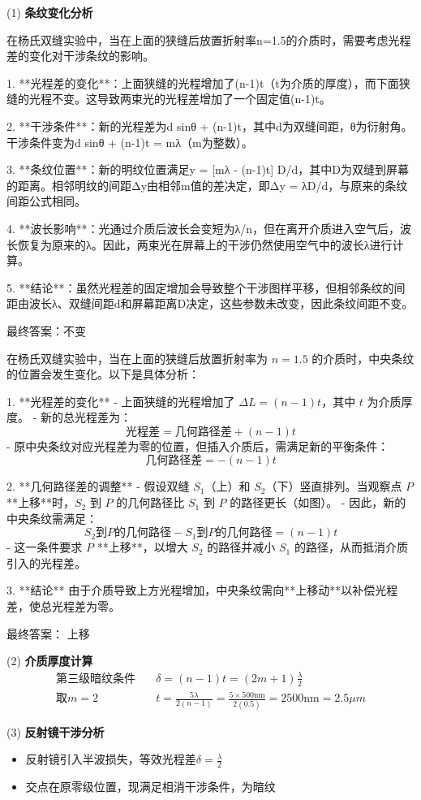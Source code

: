 \documentclass{article}
\begin{document}
\item[(1)] \textbf{条纹变化分析}
\begin{enumerate}
在杨氏双缝实验中，当在上面的狭缝后放置折射率n=1.5的介质时，需要考虑光程差的变化对干涉条纹的影响。

1. **光程差的变化**：上面狭缝的光程增加了(n-1)t（t为介质的厚度），而下面狭缝的光程不变。这导致两束光的光程差增加了一个固定值(n-1)t。

2. **干涉条件**：新的光程差为d sinθ + (n-1)t，其中d为双缝间距，θ为衍射角。干涉条件变为d sinθ + (n-1)t = mλ（m为整数）。

3. **条纹位置**：新的明纹位置满足y = [mλ - (n-1)t] D/d，其中D为双缝到屏幕的距离。相邻明纹的间距Δy由相邻m值的差决定，即Δy = λD/d，与原来的条纹间距公式相同。

4. **波长影响**：光通过介质后波长会变短为λ/n，但在离开介质进入空气后，波长恢复为原来的λ。因此，两束光在屏幕上的干涉仍然使用空气中的波长λ进行计算。

5. **结论**：虽然光程差的固定增加会导致整个干涉图样平移，但相邻条纹的间距由波长λ、双缝间距d和屏幕距离D决定，这些参数未改变，因此条纹间距不变。

最终答案：不变
\end{enumerate}
\begin{enumerate}
    在杨氏双缝实验中，当在上面的狭缝后放置折射率为 \( n = 1.5 \) 的介质时，中央条纹的位置会发生变化。以下是具体分析：

1. **光程差的变化**  
   - 上面狭缝的光程增加了 \( \Delta L = (n-1)t \)，其中 \( t \) 为介质厚度。
   - 新的总光程差为：  
     \[
     \text{光程差} = \text{几何路径差} + (n-1)t
     \]
   - 原中央条纹对应光程差为零的位置，但插入介质后，需满足新的平衡条件：  
     \[
     \text{几何路径差} = -(n-1)t
     \]

2. **几何路径差的调整**  
   - 假设双缝 \( S_1 \)（上）和 \( S_2 \)（下）竖直排列。当观察点 \( P \) **上移**时，\( S_2 \) 到 \( P \) 的几何路径比 \( S_1 \) 到 \( P \) 的路径更长（如图）。  
   - 因此，新的中央条纹需满足：  
     \[
     S_2 \text{到} P \text{的几何路径} - S_1 \text{到} P \text{的几何路径} = (n-1)t
     \]
   - 这一条件要求 \( P \) **上移**，以增大 \( S_2 \) 的路径并减小 \( S_1 \) 的路径，从而抵消介质引入的光程差。

3. **结论**  
   由于介质导致上方光程增加，中央条纹需向**上移动**以补偿光程差，使总光程差为零。

最终答案：  上移
\end{enumerate}
  
  \item[(2)] \textbf{介质厚度计算}
  \begin{align*}
    \text{第三级暗纹条件} &\quad \delta = (n-1)t = (2m+1)\frac{\lambda}{2} \\
    \text{取}m=2 &\quad t = \frac{5\lambda}{2(n-1)} = \frac{5 \times 500\text{nm}}{2(0.5)} = 2500\text{nm} = 2.5\mu m
  \end{align*}
  
  \item[(3)] \textbf{反射镜干涉分析}
  \begin{itemize}
    \item 反射镜引入半波损失，等效光程差$\delta = \frac{\lambda}{2}$
    \item 交点在原零级位置，现满足相消干涉条件，为暗纹
  \end{itemize}
\end{document}

